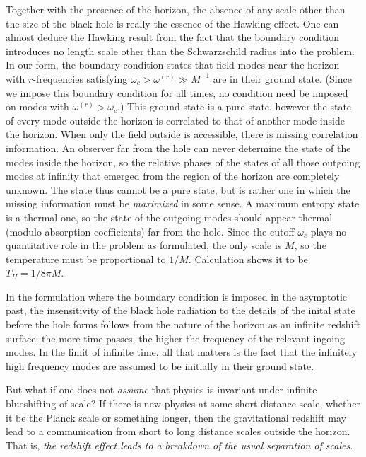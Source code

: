 \documentclass[12pt]{article}
\def\o{\omega}
\begin{document}
Together with the presence of the horizon,
the absence of any scale other than the size of
the black hole is really the essence of the
Hawking effect.
One can almost deduce the Hawking result
from the fact that the boundary condition
introduces no length scale other than the
Schwarzschild radius into the problem.
In our form, the
boundary condition states that
field modes near the horizon with $r$-frequencies satisfying
$\o_c>\o^{(r)}\gg M^{-1}$ are in their ground state. (Since we impose
this boundary condition for all times, no condition need be
imposed on modes with $\o^{(r)}>\o_c$.) This ground state is a pure
state, however the state of every mode outside the horizon
is correlated to that of another mode inside the horizon.
When only the field outside is
accessible, there is missing correlation information.
An observer far from the hole can never determine
the state of the modes inside the horizon, so the
relative phases of the states of all those outgoing modes at
infinity that emerged from the region of the
horizon are completely unknown. The state thus cannot be a
pure state, but is rather one in which
the missing information must be {\it maximized} in
some sense. A maximum entropy state is a thermal
one, so the state of the outgoing modes should appear
thermal (modulo absorption coefficients) far from the hole. Since
the cutoff $\o_c$ plays no quantitative role
in the problem as formulated, the only scale is
$M$, so the temperature must be proportional to
$1/M$. Calculation shows it to be $T_H=1/8\pi M$.

In the formulation where the boundary condition
is imposed in the asymptotic past, the insensitivity of
the black hole radiation to the details of the inital state
before the hole forms follows from the nature of the horizon as
an infinite redshift surface: the more time
passes, the higher the frequency of the relevant
ingoing modes. In the limit of infinite time,
all that matters is the fact that the infinitely
high frequency modes are assumed to be initially
in their ground state.

But what if one does not {\it assume} that
physics is invariant under infinite blueshifting of
scale? If there is new physics at some short distance scale,
whether it be the Planck scale or something longer, then the
gravitational redshift may lead to a communication
from short to long distance scales outside the horizon. That is,
{\it the redshift effect leads to a breakdown of the usual separation
of scales}.
\end{document}
